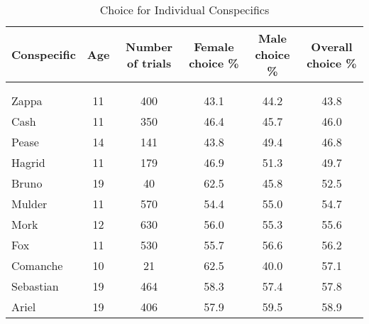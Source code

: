 \documentclass[
  ,pub,floatsintext]{apa6}
\begin{document}
\begin{table}[!h]

\caption{\label{tab:preferencetablelatex}Choice for Individual Conspecifics}
\centering
\begin{threeparttable}
\begin{tabular}[t]{lccccc}
\toprule
Conspecific & Age & Number of trials & Female choice \% & Male choice \% & Overall choice \%\\
\midrule
\addlinespace[0.3em]
\multicolumn{6}{l}{\textbf{Replicate 1}}\\
\addlinespace[0.3em]
\multicolumn{6}{l}{\textit{Males}}\\
\hspace{1em}\hspace{1em}Zappa & 11 & 400 & 43.1 & 44.2 & 43.8\\
\hspace{1em}\hspace{1em}Cash & 11 & 350 & 46.4 & 45.7 & 46.0\\
\hspace{1em}\hspace{1em}Pease & 14 & 141 & 43.8 & 49.4 & 46.8\\
\hspace{1em}\hspace{1em}Hagrid & 11 & 179 & 46.9 & 51.3 & 49.7\\
\hspace{1em}\hspace{1em}Bruno & 19 & 40 & 62.5 & 45.8 & 52.5\\
\hspace{1em}\hspace{1em}Mulder & 11 & 570 & 54.4 & 55.0 & 54.7\\
\hspace{1em}\hspace{1em}Mork & 12 & 630 & 56.0 & 55.3 & 55.6\\
\hspace{1em}\hspace{1em}Fox & 11 & 530 & 55.7 & 56.6 & 56.2\\
\hspace{1em}\hspace{1em}Comanche & 10 & 21 & 62.5 & 40.0 & 57.1\\
\hspace{1em}\hspace{1em}Sebastian & 19 & 464 & 58.3 & 57.4 & 57.8\\
\hspace{1em}\hspace{1em}Ariel & 19 & 406 & 57.9 & 59.5 & 58.9\\

\end{tabular}
\end{threeparttable}
\end{table}
\end{document}
